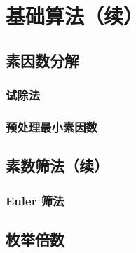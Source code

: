 
\section{基础算法（续）}
\frame{}%
\subsection{素因数分解}
\begin{frame}[c]
  \progressnow*
\end{frame}
\frame{}%
\subsubsection{试除法}
\begin{frame}[c]
  \progressnow
\end{frame}
\frame{}%
\subsubsection{预处理最小素因数}
\begin{frame}[c]
  \progressnow
\end{frame}
\frame{}%
\subsection{素数筛法（续）}
\begin{frame}[c]
  \progressnow*
\end{frame}
\frame{}%
\subsubsection{Euler 筛法}
\begin{frame}[c]
  \progressnow
\end{frame}
\frame{}%
\subsection{枚举倍数}
\begin{frame}[c]
  \progressnow*
\end{frame}
\frame{}%
